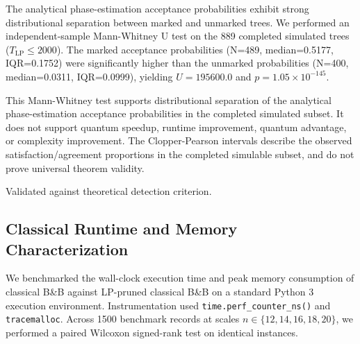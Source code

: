 \documentclass[conference]{IEEEtran}
\begin{document}
The analytical phase-estimation acceptance probabilities exhibit strong distributional separation between marked and unmarked trees. We performed an independent-sample Mann-Whitney U test on the 889 completed simulated trees ($T_{\text{LP}} \le 2000$). The marked acceptance probabilities (N=489, median=0.5177, IQR=0.1752) were significantly higher than the unmarked probabilities (N=400, median=0.0311, IQR=0.0999), yielding $U = 195600.0$ and $p = 1.05\times 10^{-145}$.

This Mann-Whitney test supports distributional separation of the analytical phase-estimation acceptance probabilities in the completed simulated subset. It does not support quantum speedup, runtime improvement, quantum advantage, or complexity improvement. The Clopper-Pearson intervals describe the observed satisfaction/agreement proportions in the completed simulable subset, and do not prove universal theorem validity.

\begin{table}[htbp]
\caption{Taxonomy of Spectral Validation}
\label{tab:measured}
\begin{center}
\begin{flushleft}
\footnotesize Validated against theoretical detection criterion.
\end{flushleft}
\end{center}
\end{table}

\subsection{Classical Runtime and Memory Characterization}
We benchmarked the wall-clock execution time and peak memory consumption of classical B\&B against LP-pruned classical B\&B on a standard Python 3 execution environment. Instrumentation used \texttt{time.perf\_counter\_ns()} and \texttt{tracemalloc}. Across 1500 benchmark records at scales $n \in \{12, 14, 16, 18, 20\}$, we performed a paired Wilcoxon signed-rank test on identical instances. 
\end{document}
